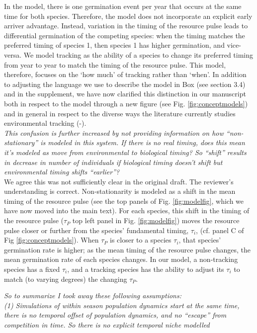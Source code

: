 \documentclass[11pt]{article}
\begin{document}
In the model, there is one germination event per year that occurs at the same time for both species.  Therefore, the model does not incorporate an explicit early arriver advantage.  Instead, variation in the timing of the resource pulse leads to differential germination of the competing species: when the timing matches the preferred timing of species 1, then species 1 has higher germination, and vice-versa.  We model tracking as the ability of a species to change its preferred timing from year to year to match the timing of the resource pulse.  This model, therefore, focuses on the `how much' of tracking rather than `when'.  In addition to adjusting the language we use to describe the model in Box (see section 3.4) and in the supplement,  we have now clarified this distinction in our manuscript both in respect to the model through a new figure (see Fig. \ref{fig:conceptmodels}) and in general in respect to the diverse ways the literature currently studies environmental tracking (-).\\ 

\emph{This confusion is further increased by not providing information on how ``non-stationary'' is
modeled in this system. If there is no real timing, does this mean it's modeled as move from
environmental to biological timing? So ``shift'' results in decrease in number of individuals
if biological timing doesn't shift but environmental timing shifts “earlier”?}\\

We agree this was not sufficiently clear in the original draft.  The reviewer's understanding is correct.  Non-stationarity is modeled as a shift in the mean timing of the resource pulse (see the top panels of Fig. \ref{fig:modelfig}, which we have now moved into the main text).  For each species, this shift in the timing of the resource pulse ($\tau_P$ top left panel in Fig. \ref{fig:modelfig}) moves the resource pulse closer or further from the species' fundamental timing, $\tau_i$, (cf. panel C of Fig \ref{fig:conceptmodels}).  When $\tau_P$ is closer to a species $\tau_i$, that species' germination rate is higher; as the mean timing of the resource pulse changes, the mean germination rate of each species changes.  In our model, a non-tracking species has a fixed $\tau_i$, and a tracking species has the ability to adjust its $\tau_i$ to match (to varying degrees) the changing $\tau_P$.  

\emph{So to summarize I took away these following assumptions:\\
(1)     Simulations of within season population dynamics start at the same time, there is no
temporal offset of population dynamics, and no ``escape'' from competition in time. So there is
no explicit temporal niche modelled}\\
\end{document}
